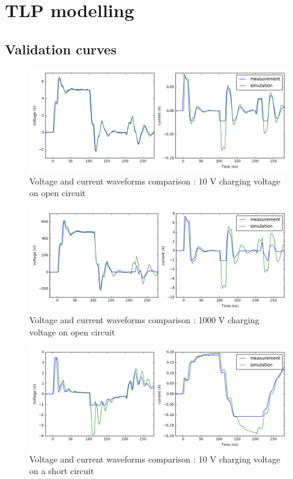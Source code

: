 \chapter{TLP modelling}
\section{Validation curves}
\label{apx:tlp-validation-curves}

\begin{figure}[!h]
  \centering
  \includegraphics[width=\textwidth]{src/2/figures/tlp_comparison_open_10V.png}
  \caption{Voltage and current waveforms comparison : 10 V charging voltage on open circuit}
  \label{fig:comparison-tlp-open-10v}
\end{figure}

\begin{figure}[!h]
  \centering
  \includegraphics[width=\textwidth]{src/2/figures/tlp_comparison_open_1000V.png}
  \caption{Voltage and current waveforms comparison : 1000 V charging voltage on open circuit}
  \label{fig:comparison-tlp-open-1000V}
\end{figure}

\begin{figure}[!h]
  \centering
  \includegraphics[width=\textwidth]{src/2/figures/tlp_comparison_short_10V.png}
  \caption{Voltage and current waveforms comparison : 10 V charging voltage on a short circuit}
  \label{fig:comparison-tlp-short-10V}
\end{figure}

